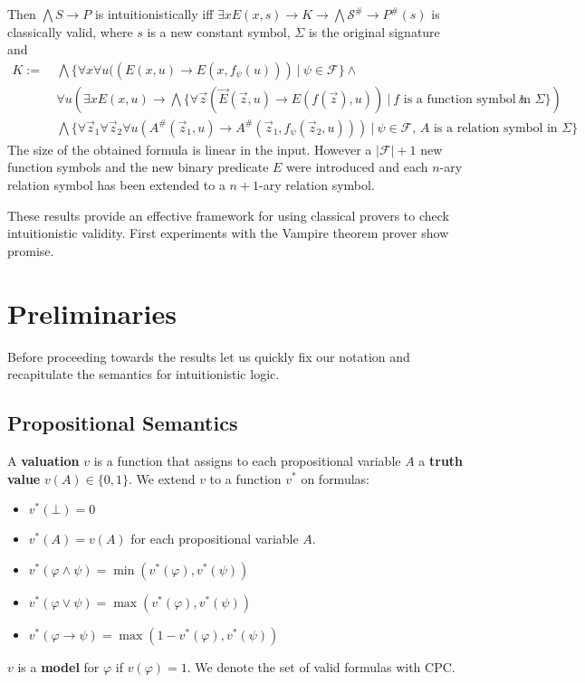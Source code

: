 \documentclass[a4paper,UKenglish,cleveref, autoref, thm-restate]{lipics-v2021}
\begin{document}
\begin{theorem}
\begin{itemize}
	\end{itemize}
	Then $\bigwedge S\to P$ is intuitionistically iff $\exists xE(x, s)\to K\to \bigwedge\mathcal S^\#\to P^\#(s)$ is classically valid, where $s$ is a new constant symbol, $\Sigma$ is the original signature and
	\begin{align*}
		K := &\:\bigwedge\{\forall x\forall u((E(x, u)\to E(x, f_\psi(u)))\:|\:\psi\in\mathcal F\}\wedge\\
		&\:\forall u\left(\exists xE(x, u)\to \bigwedge\{\forall\vec z(\vec E(\vec z, u)\to E(f(\vec z), u))\:|\:\text{$f$ is a function symbol in $\Sigma$}\}\right)\wedge\\
		&\:\bigwedge\{\forall\vec z_1\forall \vec z_2\forall u(A^\#(\vec z_1, u)\to A^\#(\vec z_1, f_\psi(\vec z_2, u)))\:|\:\text{$\psi\in\mathcal F$, $A$ is a relation symbol in $\Sigma$}\}
	\end{align*}
	The size of the obtained formula is linear in the input. However a $|\mathcal F| + 1$ new function symbols and the new binary predicate $E$ were introduced and each $n$-ary relation symbol has been extended to a $n+1$-ary relation symbol.
\end{theorem}

These results provide an effective framework for using classical provers to check intuitionistic validity. First experiments with the Vampire theorem prover show promise.


\section{Preliminaries}

Before proceeding towards the results let us quickly fix our notation and recapitulate the semantics for intuitionistic logic.

\subsection{Propositional Semantics}

\begin{definition}
	A \textbf{valuation} $v$ is a function that assigns to each propositional variable $A$ a \textbf{truth value} $v(A)\in\{0, 1\}$. We extend $v$ to a function $v^*$ on formulas:
	\begin{itemize}
		\item $v^*(\bot) = 0$
		\item $v^*(A) = v(A)$ for each propositional variable $A$.
		\item $v^*(\varphi\wedge\psi) = \min(v^*(\varphi), v^*(\psi))$
		\item $v^*(\varphi\vee\psi) = \max(v^*(\varphi), v^*(\psi))$
		\item $v^*(\varphi\to \psi) = \max(1 - v^*(\varphi), v^*(\psi))$
	\end{itemize}
	$v$ is a \textbf{model} for $\varphi$ if $v(\varphi) = 1$. We denote the set of valid formulas with CPC.
\end{definition}
\end{document}
